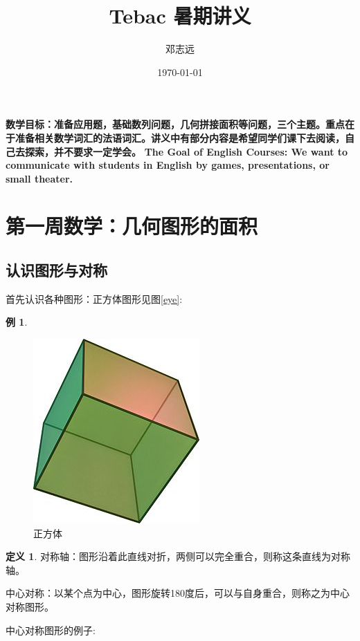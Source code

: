 \documentclass{article}
\title{Tebac 暑期讲义}
\author{邓志远 }
\date{\today}
\theoremstyle{definition}
\newtheorem{example}{例}
\newtheorem{definition}{定义}
\theoremstyle{remark}
\theoremstyle{theorem}
\begin{document}
\maketitle
\textbf{数学目标：准备应用题，基础数列问题，几何拼接面积等问题，三个主题。重点在于准备相关数学词汇的法语词汇。讲义中有部分内容是希望同学们课下去阅读，自己去探索，并不要求一定学会。}
\textbf{The Goal of English Courses: We want to communicate with students in English by games, presentations, or small theater. }

\section{第一周数学：几何图形的面积}
\subsection{认识图形与对称}
首先认识各种图形：正方体图形见图\ref{eye}:
\begin{example}
\begin{figure}
    \centering
    \includegraphics[scale=0.3]{Cube.jpg}
    \caption{正方体}
    \label{fig:my_label}
\end{figure}
\end{example}
\begin{definition}
对称轴：图形沿着此直线对折，两侧可以完全重合，则称这条直线为对称轴。

中心对称：以某个点为中心，图形旋转180度后，可以与自身重合，则称之为中心对称图形。
\end{definition}
中心对称图形的例子:
\end{document}
